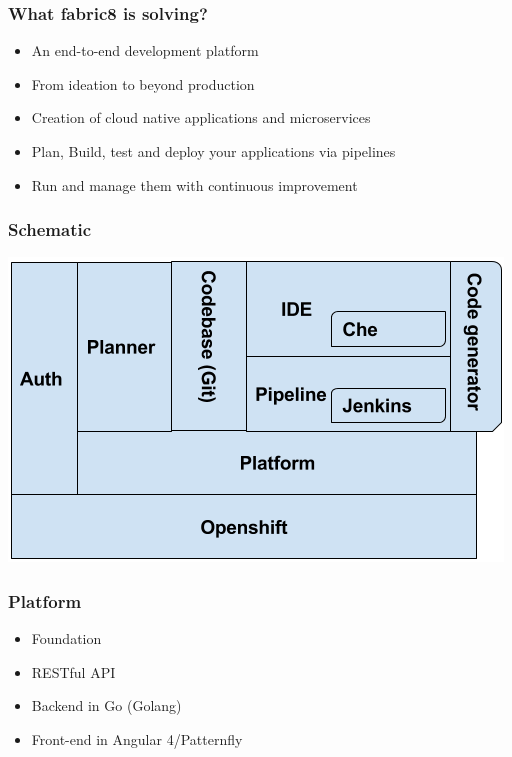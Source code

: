 \documentclass[aspectratio=169]{beamer}
\begin{document}
\begin{frame}
  \frametitle{What fabric8 is solving?}

  \begin{itemize}

  \item<1-> An end-to-end development platform

  \item<2-> From ideation to beyond production

  \item<3-> Creation of cloud native applications and  microservices

  \item<4-> Plan, Build, test and deploy your applications via pipelines

  \item<5-> Run and manage them with continuous improvement

  \end{itemize}

\end{frame}

\begin{frame}
  \frametitle{Schematic}
  \includegraphics[scale=.65]{images/schematic.png}
\end{frame}

\begin{frame}
  \frametitle{Platform}

  \begin{itemize}
  \item<1-> Foundation
  \item<2-> RESTful API
  \item<3-> Backend in Go (Golang)
  \item<4-> Front-end in Angular 4/Patternfly
  \end{itemize}

\end{frame}
\end{document}
